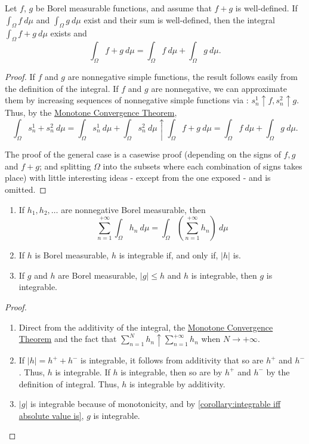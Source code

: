 \begin{prop} Let \(f\), \(g\) be Borel measurable functions, and assume
that \(f+g\) is well-defined. If \(\int_{\Omega}f~d\mu\) and
\(\int_{\Omega}g~d\mu\) exist and their sum is well-defined, then the integral
\(\int_{\Omega}f+g~d\mu\) exists and
	\[\int_{\Omega}f+g~d\mu=\int_{\Omega}f~d\mu+\int_{\Omega}g~d\mu.\]
\end{prop}
\begin{proof} If \(f\) and \(g\) are nonnegative simple functions, the result
follows easily from the definition of the integral. If \(f\) and \(g\) are
nonnegative, we can approximate them by increasing sequences of nonnegative
simple functions via :
\(s_n^1\uparrow f, s_{n}^{2}\uparrow g\). Thus, by the \hyperref[theorem:Monotone Convergence]{Monotone Convergence Theorem},
	\[\int_{\Omega}s_n^1+s_n^2~d\mu=\int_{\Omega}s_n^1~d\mu+\int_{\Omega}s_n^2~d\mu\uparrow\int_{\Omega}f+g~d\mu=\int_{\Omega}f~d\mu+\int_{\Omega}g~d\mu.\]
	
	The proof of the general case is a casewise proof (depending on the signs of
\(f, g\) and \(f+g\); and splitting \(\Omega\) into the subsets where each
combination of signs takes place) with little interesting ideas - except from
the one exposed - and is omitted.
\end{proof}
\begin{corl}
	\begin{enumerate}
		\item \label{corollary:exchange series and integral} If
\(h_1, h_2,\dots\) are nonnegative Borel measurable, then
		\[\sum_{n=1}^{+\infty}\int_{\Omega}h_n~d\mu=\int_{\Omega}\left(\sum_{n=1}^{+\infty}h_n\right)~d\mu\]
		\item \label{corollary:integrable iff absolute value is}If \(h\) is
Borel measurable, \(h\) is integrable if, and only if, \(|h|\) is.
		\item If \(g\) and \(h\) are Borel measurable, \(|g|\leq h\) and \(h\)
is integrable, then \(g\) is integrable.
	\end{enumerate}
\end{corl}
\begin{proof}
	\begin{enumerate}
		\item Direct from the additivity of the integral,
				the \hyperref[theorem:Monotone Convergence]{Monotone Convergence Theorem} and the
fact that \(\sum_{n=1}^{N}h_n\uparrow\sum_{n=1}^{+\infty}h_n\) when
\(N\to+\infty\).
		\item If \(|h|=h^++h^-\) is integrable, it follows from additivity that
so are \(h^+\) and \(h^-\). Thus, \(h\) is integrable. If \(h\) is integrable,
then so are by \(h^+\) and \(h^-\) by the definition of integral. Thus, \(h\) is
integrable by additivity.
		\item \(|g|\) is integrable because of monotonicity, and by
\ref{corollary:integrable iff absolute value is}, \(g\) is integrable.
	\end{enumerate}
\end{proof}
